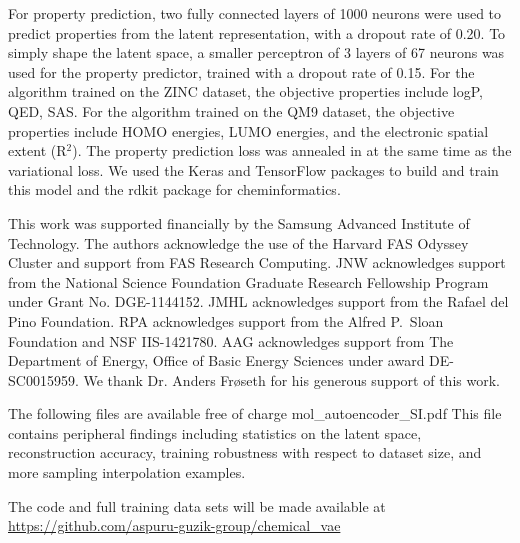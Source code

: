 \documentclass[journal=acscii,manuscript=article]{achemso}
\begin{document}
For property prediction, two fully connected layers of 1000 neurons were used to predict properties from the latent representation, with a dropout rate of 0.20. To simply shape the latent space, a smaller perceptron of 3 layers of 67 neurons was used for the property predictor, trained with a dropout rate of 0.15. For the algorithm trained on the ZINC dataset, the objective properties include logP, QED, SAS. For the algorithm trained on the QM9 dataset, the objective properties include HOMO energies, LUMO energies, and the electronic spatial extent (R$^2$). The property prediction loss was annealed in at the same time as the variational loss.
We used the Keras\cite{chollet_2015} and TensorFlow\cite{Tensorflow-2016} packages to build and train this model and the rdkit package for cheminformatics\cite{rdkit}. 


\begin{acknowledgement}

This work was supported financially by the Samsung Advanced Institute of Technology.
The authors acknowledge the use of the Harvard FAS Odyssey Cluster and support from FAS Research Computing.
JNW acknowledges support from the National Science Foundation Graduate Research Fellowship Program under Grant No. DGE-1144152.
JMHL acknowledges support from the Rafael del Pino Foundation. RPA acknowledges support from the Alfred P.\ Sloan Foundation and NSF IIS-1421780. AAG acknowledges support from The Department of Energy, Office of Basic Energy Sciences under award DE-SC0015959.
We thank Dr. Anders Fr\o seth for his generous support of this work.

\end{acknowledgement}

\begin{suppinfo}
The following files are available free of charge  mol\_autoencoder\_SI.pdf
This file contains peripheral findings including statistics on the latent space, reconstruction accuracy, training robustness with respect to dataset size, and more sampling interpolation examples.
 
 The code and full training data sets will be made available at \url{https://github.com/aspuru-guzik-group/chemical_vae}

\end{suppinfo}



\end{document}
